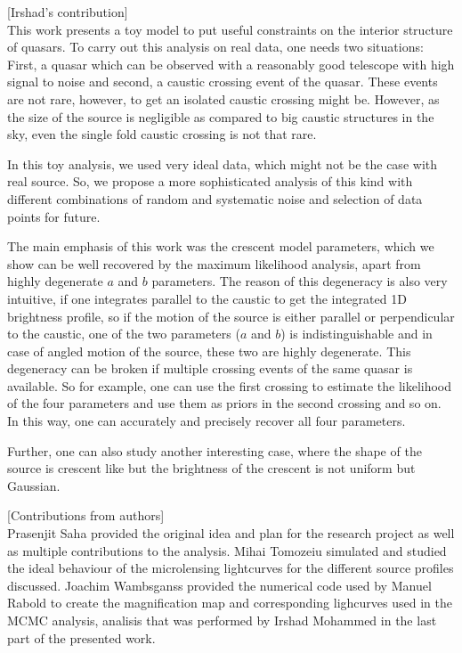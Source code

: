 [Irshad's contribution]\\

This work presents a toy model to put useful constraints on the interior structure of quasars. To carry out this analysis on real data, one needs two situations: First, a quasar which can be observed with a reasonably good telescope with high signal to noise and second, a caustic crossing event of the quasar. These events are not rare, however, to get an isolated caustic crossing might be. However, as the size of the source is negligible as compared to big caustic structures in the sky, even the single fold caustic crossing is not that rare.

In this toy analysis, we used very ideal data, which might not be the case with real source. So, we propose a more sophisticated analysis of this kind with different combinations of random and systematic noise and selection of data points for future.

The main emphasis of this work was the crescent model parameters, which we show can be well recovered by the maximum likelihood analysis, apart from highly degenerate $a$ and $b$ parameters. The reason of this degeneracy is also very intuitive, if one integrates parallel to the caustic to get the integrated 1D brightness profile, so if the motion of the source is either parallel or perpendicular to the caustic, one of the two parameters ($a$ and $b$) is indistinguishable and in case of angled motion of the source, these two are highly degenerate. This degeneracy can be broken if multiple crossing events of the same quasar is available. So for example, one can use the first crossing to estimate the likelihood of the four parameters and use them as priors in the second crossing and so on. In this way, one can accurately and precisely recover all four parameters.

Further, one can also study another interesting case, where the shape of the source is crescent like but the brightness of the crescent is not uniform but Gaussian.






[Contributions from authors]\\
Prasenjit Saha provided the original idea and plan for the research project as well as multiple contributions to the analysis. Mihai Tomozeiu simulated and studied the ideal behaviour of the microlensing lightcurves for the different source profiles discussed. Joachim Wambsganss provided the numerical code used by Manuel Rabold to create the magnification map and corresponding lighcurves used in the MCMC analysis, analisis that was performed by Irshad Mohammed in the last part of the presented work. 
